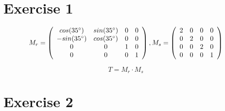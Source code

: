 \documentclass[10pt]{article}
\begin{document}
  \section*{Exercise 1}
    
    \begin{displaymath}
      M_r=
      \left(\begin{array}{ c c c c }
        cos(35\degree) & sin(35\degree) & 0 & 0 \\
        -sin(35\degree) & cos(35\degree) & 0 & 0 \\
        0 & 0 & 1 & 0 \\
        0 & 0 & 0 & 1
      \end{array} \right),
      M_s=
      \left( \begin{array}{ c c c c }
        2 & 0 & 0 & 0 \\
        0 & 2 & 0 & 0 \\
        0 & 0 & 2 & 0 \\
        0 & 0 & 0 & 1 \\
      \end{array} \right)
    \end{displaymath}

    \begin{displaymath}
      T = M_r \cdot M_s
    \end{displaymath}


    \section*{Exercise 2}
\end{document}
